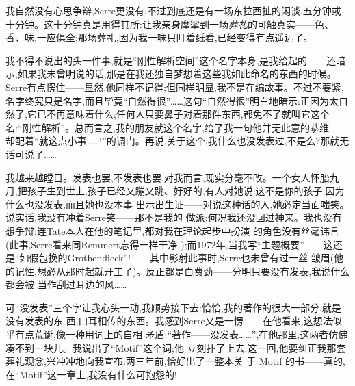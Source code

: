 我自然没有心思争辩,Serre更没有,不过到底还是有一场东拉西扯的闲谈,五分钟或十分钟。这十分钟真是用得其所:让我亲身摩挲到一场\emph{葬礼}的可触真实——色、香、味,一应俱全;那场葬礼,因为我一味只盯着纸看,已经变得有点遥远了。

我不得不说出的头一件事,就是“刚性解析空间”这个名字本身,是我给起的——还暗示,如果我未曾明说的话,那是在我还独自梦想着这些我如此命名的东西的时候。Serre有点愣住——显然,他同样不记得;但同样明显,我不是在编故事。不过不要紧,名字终究只是名字,而且毕竟“自然得很”……这句“自然得很”明白地暗示:正因为太自然了,它已不再意味着什么;任何人只要鼻子对着那件东西,都免不了就叫它这个名:“刚性解析”。总而言之,我的朋友就这个名字,给了我一句他并无此意的恭维——却配着“就这点小事……!”的调门。再说,关于这个,我什么也没发表过,不是么?那就无话可说了……

我越来越瞠目。发表也罢,不发表也罢,对我而言,现实分毫不改。一个女人怀胎九月,把孩子生到世\dmark{}上,孩子已经又蹦又跳、好好的,有人对她说:这不是你的孩子,因为什么也没发表,而且她也没本事
出示出生证——对说这种话的人,她必定当面嗤笑。说实话,我没有冲着Serre笑——那不是我的
做派;何况我还没回过神来。我也没有想争辩:连Tate本人在他的笔记里,都对我在理论起步中扮演
的角色没有丝毫讳言(此事,Serre看来同Remmert忘得一样干净
);而1972年,当我写“主题概要”——这还是“如假包换的Grothendieck”!——其中影射此事时,Serre也未曾有过一丝
皱眉(他的记性,想必从那时起就开工了)。反正都是白费劲——分明只要没有发表,我说什么都会被
当作刮过耳边的风……

可“没发表”三个字让我心头一动,我顺势接下去:恰恰,我的著作的很大一部分,就是没有发表的东
西,口耳相传的东西。我感到Serre又是一愣——在他看来,这想法似乎有点荒诞,像一种用词上的自相
矛盾:“著作——没发表……”,在他那里,这两者仿佛凑不到一块儿\dmark{}。我说出了“Motif”这个词;他
立刻扑了上去:这一回,他要纠正我那套葬礼观念,兴冲冲地向我宣布:两三年前,恰好出了一整本关
于 Motif 的书——真的,在“Motif”这一章上,我没有什么可抱怨的!

